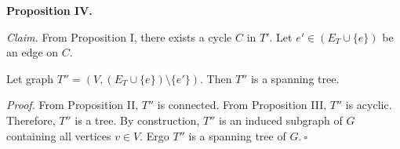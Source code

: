 \begin{enumerate}
\begin{solution}
\textbf{Proposition IV. }

\textit{Claim. }From Proposition I, there exists a cycle $C$ in $T'$. Let $e'\in(E_T\cup\{e\})$ be an edge on $C$.

Let graph $T''=(V,(E_T\cup\{e\})\setminus\{e'\})$. Then $T''$ is a spanning tree.

\textit{Proof. }From Proposition II, $T''$ is connected. From Proposition III, $T''$ is acyclic. Therefore, $T''$ is a tree. By construction, $T''$ is an induced subgraph of $G$ containing all vertices $v\in V$. Ergo $T''$ is a spanning tree of $G.~\square$
\end{solution}
\end{enumerate}